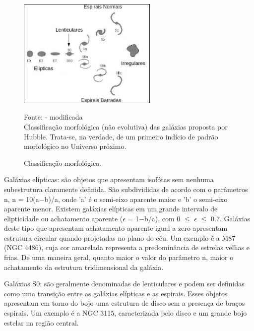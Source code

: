 \begin{figure}[!htb]
	\centering	
    \caption{Classificação morfológica.}
    \includegraphics[width=0.6\textwidth]{figuras/espirais_normais.png}
   	\begin{center}
        \normalsize Fonte: \cite{brandt_2017} - modificada \\Classificação morfológica (não evolutiva) das galáxias proposta por Hubble. Trata-se, na verdade, de um primeiro indício de padrão morfológico no Universo próximo.
    \end{center}
	\label{fig:galaxies-classification}
\end{figure}

Galáxias elípticas: são objetos que apresentam isofótas sem nenhuma subestrutura claramente definida. São subdivididas de acordo com o parâmetros n, n = 10(a$-$b)/a, onde 'a' é o semi-eixo aparente maior e 'b' o semi-eixo aparente menor. Existem galáxias elípticas em um grande intervalo de elipticidade ou achatamento aparente ($\epsilon$ = 1$-$b/a), com 0 $\leq$ $\epsilon$ $\leq$ 0.7. Galáxias deste tipo que apresentam achatamento aparente igual a zero apresentam estrutura circular quando projetadas no plano do céu. Um exemplo é a M87 (NGC 4486), cuja cor amarelada representa a predominância de estrelas velhas e frias. De uma maneira geral, quanto maior o valor do parâmetro n, maior o achatamento da estrutura tridimensional da galáxia.

Galáxias S0: são geralmente denominadas de lenticulares e podem ser definidas como uma transição entre as galáxias elípticas e as espirais. Esses objetos apresentam em torno do bojo uma estrutura de disco sem a presença de braços espirais. Um exemplo é a NGC 3115, caracterizada pelo disco e um grande bojo estelar na região central. 

